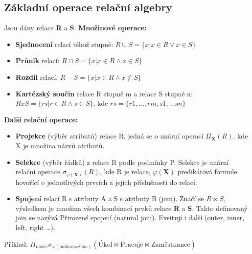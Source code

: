 \subsection{Základní operace relační algebry}
Jsou dány relace \textbf{R} a \textbf{S}. \textbf{Množinové operace:}
\begin{itemize}
    \item \textbf{Sjednocení} relací téhož stupně:      $R \cup S = \{x | x \in R \vee x \in S\}$
    \item \textbf{Průnik} relací:                                 $R \cap S = \{x | x \in R \wedge x \in S\}$
    \item \textbf{Rozdíl} relací:                                   $R  -  S = \{x | x \in R \wedge x \notin S\}$
    \item \textbf{Kartézský součin} relace R stupně m a relace S stupně n: $R x S = \{rs | r \in R \wedge s \in S\}$,  kde  $rs = \{r1,...,rm,s1,...sn\}$
\end{itemize}
\textbf{Další relační operace: }
\begin{itemize}
    \item \textbf{Projekce} (výběr atributů) relace R, jedná se o unární operaci $\Pi_\mathbf{X}( R )$, kde X je množina názvů atributů.
    \item \textbf{Selekce} (výběr řádků) z relace R podle podmínky P. Selekce je unární relační operace $\sigma_{\varphi(\mathbf{X})}( R )$, kde R je relace, $\varphi(\mathbf{X})$ predikátová formule hovořící o jednotlivých prvcích a jejich příslušnosti do relací.
    \item \textbf{Spojení} relací R s atributy A  a  S  s atributy  B (join).  Značí se $R \bowtie S$, výsledkem je množina všech kombinací prvků relace \textbf{R} a \textbf{S}. Takto definovaný join se nazývá Přirozené spojení (natural join). Exsitují i další (outer, inner, left, right \ldots).
\end{itemize}

Příklad: $\Pi_\textrm{název} \sigma_{\varphi(\textrm{pohlaví=žena})} (\textrm{Úkol}\bowtie\textrm{Pracuje}\bowtie\textrm{Zaměstnanec})$


